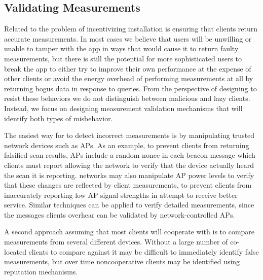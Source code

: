 \subsection{Validating Measurements}
\label{subsec-validation}

Related to the problem of incentivizing installation is ensuring that clients
return accurate measurements. In most cases we believe that users will be
unwilling or unable to tamper with the \PS{} app in ways that would cause it
to return faulty measurements, but there is still the potential for more
sophisticated users to break the app to either try to improve their own
performance at the expense of other clients or avoid the energy overhead of
performing measurements at all by returning bogus data in response to \PS{}
queries. From the perspective of designing \PS{} to resist these behaviors we
do not distinguish between malicious and lazy clients. Instead, we focus on
designing measurement validation mechanisms that will identify both types of
misbehavior.

The easiest way for \PS{} to detect incorrect measurements is by manipulating
trusted network devices such as APs. As an example, to prevent clients from
returning falsified scan results, \PS{} APs include a random nonce in each
beacon message which clients must report allowing the network to verify that
the device actually heard the scan it is reporting. \PS{} networks may also
manipulate AP power levels to verify that these changes are reflected by
client measurements, to prevent clients from inaccurately reporting low AP
signal strengths in attempt to receive better service. Similar techniques can
be applied to verify detailed measurements, since the messages clients
overhear can be validated by network-controlled APs.

A second approach assuming that most clients will cooperate with \PS{} is to
compare measurements from several different devices. Without a large number
of co-located clients to compare against it may be difficult to immediately
identify false measurements, but over time noncooperative clients may be
identified using reputation mechanisms.
